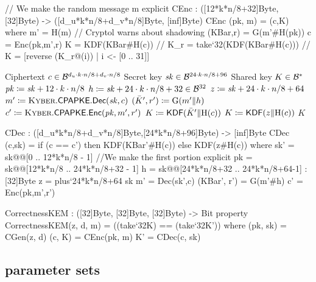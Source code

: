 \begin{code}
  // We make the random message m explicit
  CEnc : ([12*k*n/8+32]Byte, [32]Byte) -> ([d_u*k*n/8+d_v*n/8]Byte, [inf]Byte)
  CEnc (pk, m) = (c,K) where
    m' = H(m) // Cryptol warns about shadowing
    (KBar,r) = G(m'#H(pk))
    c = Enc(pk,m',r)
    K = KDF(KBar#H(c))
    // K_r = take`{32}(KDF(KBar#H(c)))
    // K = [reverse (K_r@(i)) | i <- [0 .. 31]]
\end{code}

\begin{algorithm}
  \caption{$\KyberCCAKEM.\KEMDec(c,\sk)$\label{alg:ccadec}}
  \begin{algorithmic}[1]
    \Require Ciphertext $c \in \mathcal{B}^{d_u\cdot k\cdot n/8 + d_v\cdot n/8}$
    \Require Secret key $\mathit{sk} \in \mathcal{B}^{24\cdot k\cdot n/8 + 96}$
    \Ensure Shared key $K \in \mathcal{B}^*$
    \State $\mathit{pk} \coloneqq \mathit{sk}+12\cdot k\cdot n/8$
    \State $h \coloneqq \mathit{sk}+24\cdot k\cdot n/8 + 32 \in \mathcal{B}^{32}$
    \State $z \coloneqq \mathit{sk}+24\cdot k\cdot n/8 + 64$
    \State $m'\coloneqq \text{{\sc Kyber}}.{\sf CPAPKE}.\mathsf{Dec}(\mathit{sk},c)$
    \State $(\bar{K}',r') \coloneqq \text{G}(m'\Vert h)$
    \State $c' \coloneqq \text{{\sc Kyber}}.{\sf CPAPKE}.\mathsf{Enc}(\mathit{pk}, m', r')$
      \State \Return $K \coloneqq \mathsf{KDF}(\bar{K}'\Vert \text{H}(c))$
    \Else
      \State \Return $K \coloneqq \mathsf{KDF}(z\Vert \text{H}(c))$
    \EndIf 
    \State \Return $K$
  \end{algorithmic}
\end{algorithm}

\begin{code}
  CDec : ([d_u*k*n/8+d_v*n/8]Byte,[24*k*n/8+96]Byte) -> [inf]Byte
  CDec (c,sk) = if (c == c') then KDF(KBar'#H(c))
                             else KDF(z#H(c))
    where
      sk' = sk@@[0 .. 12*k*n/8 - 1] //We make the first portion explicit
      pk = sk@@[12*k*n/8 .. 24*k*n/8+32 - 1]
      h = sk@@[24*k*n/8+32 .. 24*k*n/8+64-1] : [32]Byte
      z = plus`{24*k*n/8+64} sk
      m' = Dec(sk',c)
      (KBar', r') = G(m'#h)
      c' = Enc(pk,m',r')


  CorrectnessKEM : ([32]Byte, [32]Byte, [32]Byte) -> Bit
  property CorrectnessKEM(z, d, m) = ((take`{32}K) == (take`{32}K')) where
    (pk, sk) = CGen(z, d)
    (c, K) = CEnc(pk, m)
    K' = CDec(c, sk)
\end{code}

\subsection{\Kyber parameter sets}
\label{subsec:specification:params}

